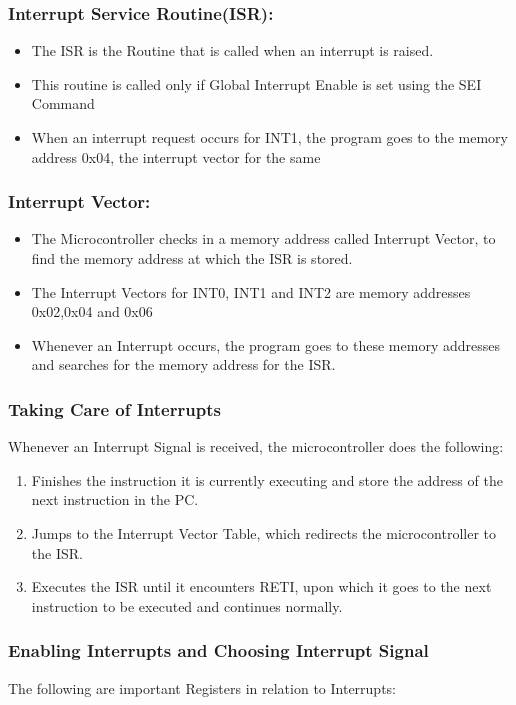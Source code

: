 \documentclass[titlepage, 11pt]{article}
\begin{document}
\subsubsection{Interrupt Service Routine(ISR):}
\begin{itemize}
    \item The ISR is the Routine that is called when an interrupt is raised. 
    \item This routine is called only if Global Interrupt Enable is set using the SEI Command
    \item When an interrupt request occurs for INT1, the program goes to the memory address 0x04, the interrupt vector for the same
\end{itemize}

\subsubsection{Interrupt Vector:}
\begin{itemize}
    \item The Microcontroller checks in a memory address called Interrupt Vector, to find the memory address at which the ISR is stored.
    \item The Interrupt Vectors for INT0, INT1 and INT2 are memory addresses 0x02,0x04 and 0x06
    \item Whenever an Interrupt occurs, the program goes to these memory addresses and searches for the memory address for the ISR.
\end{itemize}

\subsubsection{Taking Care of Interrupts}
Whenever an Interrupt Signal is received, the microcontroller does the following:
    \begin{enumerate}
        \item Finishes the instruction it is currently executing and store the address of the next instruction in the PC.
        \item Jumps to the Interrupt Vector Table, which redirects the microcontroller to the ISR.
        \item Executes the ISR until it encounters RETI, upon which it goes to the next instruction to be executed and continues normally.
    \end{enumerate}

\subsubsection{Enabling Interrupts and Choosing Interrupt Signal}
The following are important Registers in relation to Interrupts:
\end{document}
